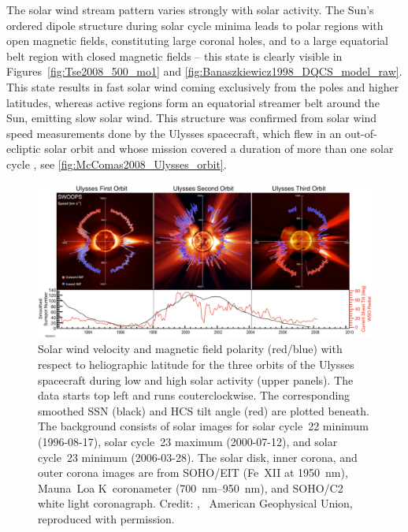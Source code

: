 The solar wind stream pattern varies strongly with solar activity. The Sun's ordered dipole structure during solar cycle minima leads to polar regions with open magnetic fields, constituting large coronal holes, and to a large equatorial belt region with closed magnetic fields -- this state is clearly visible in Figures~\ref{fig:Tse2008_500_mo1} and \ref{fig:Banaszkiewicz1998_DQCS_model_raw}. This state results in fast solar wind coming exclusively from the poles and higher latitudes, whereas active regions form an equatorial streamer belt around the Sun, emitting slow solar wind. This structure was confirmed from solar wind speed measurements done by the Ulysses spacecraft, which flew in an out-of-ecliptic solar orbit and whose mission covered a duration of more than one solar cycle \citep{McComas200809}, see \autoref{fig:McComas2008_Ulysses_orbit}.
\begin{figure}[htb]
	\centering
	\includegraphics[width=\textwidth]{figures_of_others/images/McComas2008_Ulysses_orbit_.png}
	\caption[Credit: {\citet[Fig.~1]{McComas200809}}, \textcopyright~American Geophysical Union, reproduced with permission.]
	{Solar wind velocity and magnetic field polarity (red/blue) with respect to heliographic latitude for the three orbits of the Ulysses spacecraft during low and high solar activity (upper panels). The data starts top left and runs couterclockwise. The corresponding smoothed SSN (black) and HCS tilt angle (red) are plotted beneath. The background consists of solar images for solar cycle~22 minimum (1996-08-17), solar cycle~23 maximum (2000-07-12), and solar cycle~23 minimum (2006-03-28). The solar disk, inner corona, and outer corona images are from SOHO/EIT (Fe~XII at \SI{1950}{\nano\meter}), Mauna~Loa K~coronameter (\SIrange{700}{950}{\nano\meter}), and SOHO/C2 white light coronagraph. Credit: {\citet[Fig.~1]{McComas200809}}, \textcopyright~American Geophysical Union, reproduced with permission.}
	\label{fig:McComas2008_Ulysses_orbit}
\end{figure}
